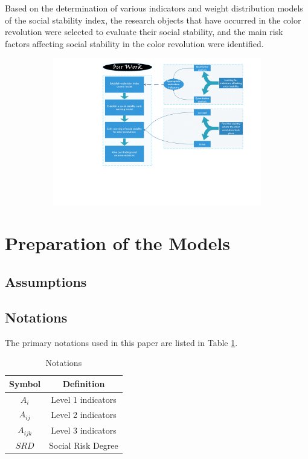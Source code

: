 \documentclass[12pt]{article}  %
\begin{document}
Based on the determination of various indicators and weight distribution models of the social stability index, the research objects that have occurred in the color revolution were selected to evaluate their social stability, and the main risk factors affecting social stability in the color revolution were identified.
\begin{figure}[htbp]
\centering
\begin{subfigure}[b]{\textwidth}
\includegraphics[width=\textwidth]{img/our work.pdf}
\end{subfigure}
\end{figure}
\section{Preparation of the Models}
\subsection{Assumptions}

\subsection{Notations}
The primary notations used in this paper are listed in Table \ref{tb:notation}.

\begin{table}[!htbp]
\begin{center}
\caption{Notations}
\begin{tabular}{cc}
	\toprule
	\multicolumn{1}{m{3cm}}{\centering Symbol}
	&\multicolumn{1}{m{8cm}}{\centering Definition}\\
	\midrule
	$A_i$&Level 1 indicators\\
	$A_{ij}$&Level 2 indicators\\
	$A_{ijk}$ &Level 3 indicators\\
	$SRD$&Social Risk Degree\\
	\bottomrule
\end{tabular}\label{tb:notation}
\end{center}
\end{table}
\end{document}
